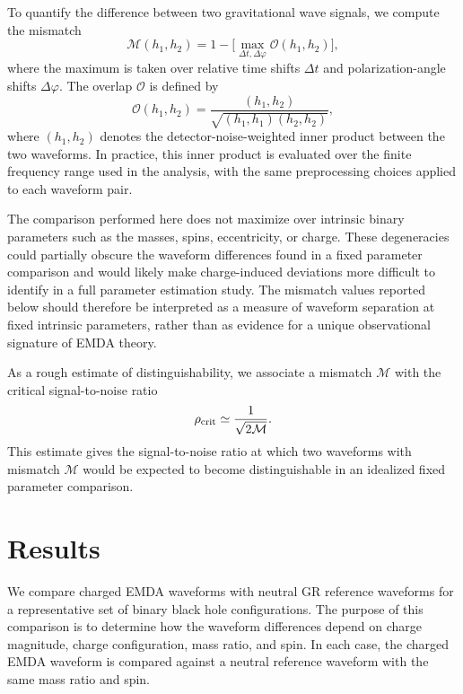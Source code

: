 To quantify the difference between two gravitational wave signals, we compute the mismatch
\begin{equation}
\mathcal{M}(h_1,h_2)
=
1-\lbrack \max_{\Delta t,\Delta\varphi}\mathcal{O}(h_1,h_2)\rbrack,
\label{eq:mismatch_def}
\end{equation}
where the maximum is taken over relative time shifts $\Delta t$ and polarization-angle shifts $\Delta\varphi$. The overlap $\mathcal{O}$ is defined by
\begin{equation}
\mathcal{O}(h_1,h_2)
=
\frac{(h_1,h_2)}
{\sqrt{(h_1,h_1)(h_2,h_2)}} ,
\label{eq:overlap_def}
\end{equation}
where $(h_1,h_2)$ denotes the detector-noise-weighted inner product between the two waveforms. In practice, this inner product is evaluated over the finite frequency range used in the analysis, with the same preprocessing choices applied to each waveform pair.

The comparison performed here does not maximize over intrinsic binary parameters such as the masses, spins, eccentricity, or charge. These degeneracies could partially obscure the waveform differences found in a fixed parameter comparison and would likely make charge-induced deviations more difficult to identify in a full parameter estimation study. The mismatch values reported below should therefore be interpreted as a measure of waveform separation at fixed intrinsic parameters, rather than as evidence for a unique observational signature of EMDA theory.

As a rough estimate of distinguishability, we associate a mismatch $\mathcal{M}$ with the critical signal-to-noise ratio
\begin{equation}
\rho_{\rm crit}
\simeq
\frac{1}{\sqrt{2\mathcal{M}}}.
\label{eq:rho_crit}
\end{equation}
This estimate gives the signal-to-noise ratio at which two waveforms with mismatch $\mathcal{M}$ would be expected to become distinguishable in an idealized fixed parameter comparison. 

\section{Results}
\label{sec:results}

We compare charged EMDA waveforms with neutral GR reference waveforms for a representative set of binary black hole configurations. The purpose of this comparison is to determine how the waveform differences depend on charge magnitude, charge configuration, mass ratio, and spin. In each case, the charged EMDA waveform is compared against a neutral reference waveform with the same mass ratio and spin.

